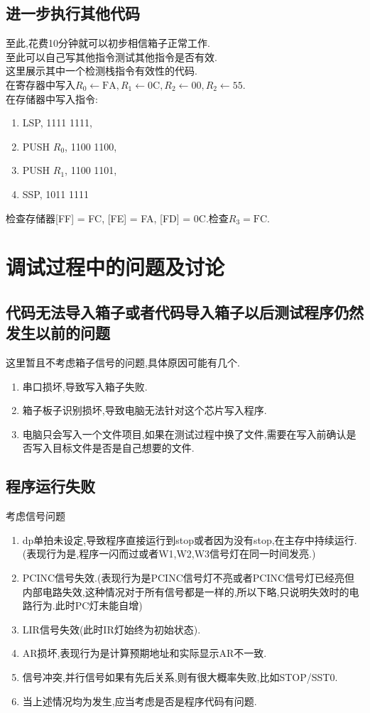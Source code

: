 \documentclass[UTF8]{ctexart}
\begin{document}
\subsection{进一步执行其他代码}
至此,花费10分钟就可以初步相信箱子正常工作.\\
\indent 至此可以自己写其他指令测试其他指令是否有效.\\
\indent 这里展示其中一个检测栈指令有效性的代码.\\
\indent 在寄存器中写入$R_0\leftarrow \text{FA}, R_1\leftarrow \text{0C}, R_2\leftarrow \text{00}, R_2\leftarrow \text{55}$.\\
\indent 在存储器中写入指令:
\begin{enumerate}[\indent\indent]
	\item LSP, 1111 1111,
	\item PUSH $R_0$, 1100 1100,
	\item PUSH $R_1$, 1100 1101,
	\item SSP, 1011 1111
\end{enumerate}
检查存储器[FF] = FC, [FE] = FA, [FD] = 0C.检查$R_3=\text{FC}$.

\newpage
\section{调试过程中的问题及讨论}
\subsection{代码无法导入箱子或者代码导入箱子以后测试程序仍然发生以前的问题}
这里暂且不考虑箱子信号的问题,具体原因可能有几个.
\begin{enumerate}[1]
	\item 串口损坏,导致写入箱子失败.
	\item 箱子板子识别损坏,导致电脑无法针对这个芯片写入程序.
	\item 电脑只会写入一个文件项目,如果在测试过程中换了文件,需要在写入前确认是否写入目标文件是否是自己想要的文件.
\end{enumerate}
\subsection{程序运行失败}
考虑信号问题
\begin{enumerate}[1]
	\item dp单拍未设定,导致程序直接运行到stop或者因为没有stop,在主存中持续运行.(表现行为是,程序一闪而过或者W1,W2,W3信号灯在同一时间发亮.)
	\item PCINC信号失效.(表现行为是PCINC信号灯不亮或者PCINC信号灯已经亮但内部电路失效,这种情况对于所有信号都是一样的,所以下略,只说明失效时的电路行为.此时PC灯未能自增)
	\item LIR信号失效(此时IR灯始终为初始状态).
	\item AR损坏,表现行为是计算预期地址和实际显示AR不一致.
	\item 信号冲突,并行信号如果有先后关系,则有很大概率失败,比如STOP/SST0.
	\item 当上述情况均为发生,应当考虑是否是程序代码有问题.
\end{enumerate}
\end{document}
